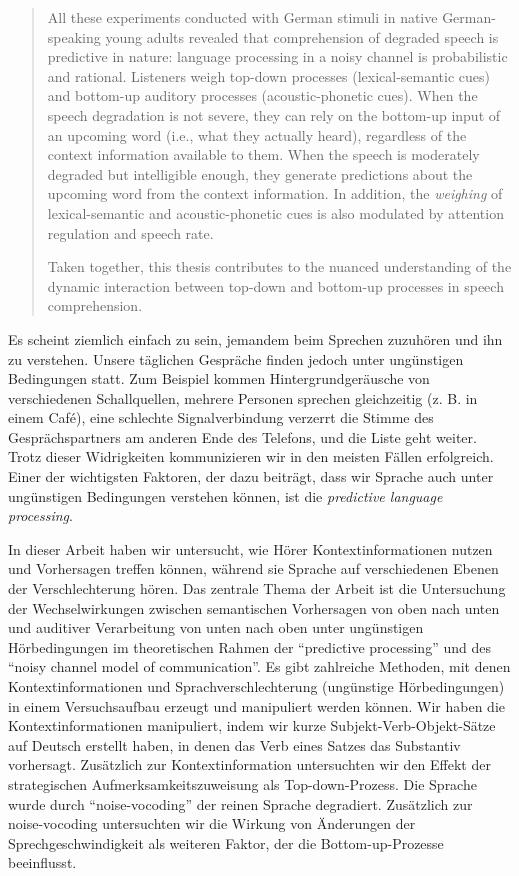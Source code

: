 \documentclass[a4paper, nobind]{templates/ociamthesis}
\begin{document}
\begin{romanpages}
\begin{abstract}
All these experiments conducted with German stimuli in native German-speaking young adults revealed that comprehension of degraded speech is predictive in nature:
language processing in a noisy channel is probabilistic and rational.
Listeners weigh top-down processes (lexical-semantic cues) and bottom-up auditory processes (acoustic-phonetic cues).
When the speech degradation is not severe, they can rely on the bottom-up input of an upcoming word (i.e., what they actually heard), regardless of the context information available to them.
When the speech is moderately degraded but intelligible enough, they generate predictions about the upcoming word from the context information.
In addition, the \emph{weighing} of lexical-semantic and acoustic-phonetic cues is also modulated by attention regulation and speech rate.

Taken together, this thesis contributes to the nuanced understanding of the dynamic interaction between top-down and bottom-up processes in speech comprehension.
\end{abstract}




\renewcommand{\abstractsecondtitle}{Zusammenfassung}
\begin{abstractsecond}
	Es scheint ziemlich einfach zu sein, jemandem beim Sprechen zuzuhören und ihn zu verstehen. Unsere täglichen Gespräche finden jedoch unter ungünstigen Bedingungen statt. Zum Beispiel kommen Hintergrundgeräusche von verschiedenen Schallquellen, mehrere Personen sprechen gleichzeitig (z. B. in einem Café), eine schlechte Signalverbindung verzerrt die Stimme des Gesprächspartners am anderen Ende des Telefons, und die Liste geht weiter. Trotz dieser Widrigkeiten kommunizieren wir in den meisten Fällen erfolgreich. Einer der wichtigsten Faktoren, der dazu beiträgt, dass wir Sprache auch unter ungünstigen Bedingungen verstehen können, ist die \emph{predictive language processing}.

In dieser Arbeit haben wir untersucht, wie Hörer Kontextinformationen nutzen und Vorhersagen treffen können, während sie Sprache auf verschiedenen Ebenen der Verschlechterung hören. Das zentrale Thema der Arbeit ist die Untersuchung der Wechselwirkungen zwischen semantischen Vorhersagen von oben nach unten und auditiver Verarbeitung von unten nach oben unter ungünstigen Hörbedingungen im theoretischen Rahmen der ``predictive processing'' und des ``noisy channel model of communication''. Es gibt zahlreiche Methoden, mit denen Kontextinformationen und Sprachverschlechterung (ungünstige Hörbedingungen) in einem Versuchsaufbau erzeugt und manipuliert werden können. Wir haben die Kontextinformationen manipuliert, indem wir kurze Subjekt-Verb-Objekt-Sätze auf Deutsch erstellt haben, in denen das Verb eines Satzes das Substantiv vorhersagt. Zusätzlich zur Kontextinformation untersuchten wir den Effekt der strategischen Aufmerksamkeitszuweisung als Top-down-Prozess. Die Sprache wurde durch ``noise-vocoding'' der reinen Sprache degradiert. Zusätzlich zur noise-vocoding untersuchten wir die Wirkung von Änderungen der Sprechgeschwindigkeit als weiteren Faktor, der die Bottom-up-Prozesse beeinflusst.


\end{abstractsecond}
\end{romanpages}
\end{document}
